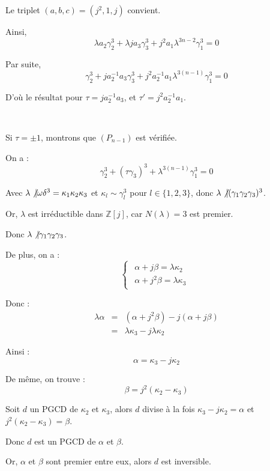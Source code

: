 Le triplet $(a, b, c) = (j^2, 1, j)$ convient.

Ainsi,
\[ \lambda a_2 \gamma^3_2 + \lambda j a_3 \gamma^3_3 + j^2 a_1 \lambda^{3 n -
   2} \gamma^3_1 = 0 \]


Par suite,
\[ \gamma^3_2 + j a^{- 1}_2 a_3 \gamma^3_3 + j^2 a^{- 1}_2 a_1 \lambda^{3 (n -
   1)} \gamma^3_1 = 0 \]


D'o{\`u} le r{\'e}sultat pour $\tau = j a^{- 1}_2 a_3$, et $\tau' = j^2 a^{-
1}_2 a_1$.

\

 Si $\tau = \pm 1$, montrons que $(P_{n - 1})$ est
v{\'e}rifi{\'e}e.

On a :
\[ \gamma^3_2 + (\tau \gamma _3)^3 + \lambda^{3 (n - 1)} \gamma^3_1 = 0 \]


Avec $\lambda \not{| } \omega \delta^3 = \kappa_1 \kappa_2 \kappa_3$
et $\kappa_l \sim \gamma_l^3$ pour $l \in \{ 1, 2, 3 \}$, donc $\lambda \not{|
} (\gamma _1 \gamma _2 \gamma _3)^3$.

Or, $\lambda$ est irr{\'e}ductible dans $\mathbb{Z} [j]$, car $N (\lambda) =
3$ est premier.

Donc $\lambda \not{| } \gamma _1 \gamma _2 \gamma _3 $.

De plus, on a :
\[ \left\{\begin{array}{l}
     \begin{array}{c}
       \alpha + j  \beta = \lambda  \kappa_2\\
       \alpha + j^2 \beta = \lambda  \kappa_3
     \end{array}
   \end{array}\right. \]


Donc :
\begin{eqnarray*}
  \lambda \alpha & = & (\alpha + j^2 \beta) - j (\alpha + j \beta)\\
  & = & \lambda \kappa_3 - j \lambda \kappa_2
\end{eqnarray*}


Ainsi :
\[ \alpha = \kappa_3 - j \kappa_2 \]


De m{\^e}me, on trouve :
\[ \beta = j^2 (\kappa_2 - \kappa_3) \]


Soit $d$ un PGCD de $\kappa_2$ et $\kappa_3$, alors $d$ divise {\`a} la fois
$\kappa_3 - j \kappa_2 = \alpha$ et $j^2 (\kappa_2 - \kappa_3) = \beta$.

Donc $d$ est un PGCD de $\alpha$ et $\beta$.

Or, $\alpha$ et $\beta$ sont premier entre eux, alors $d$ est inversible.


